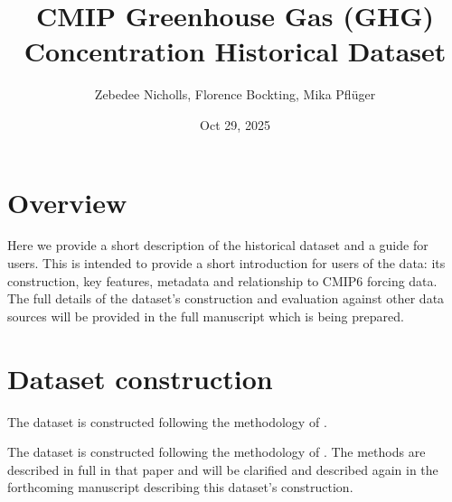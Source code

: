 \documentclass[letterpaper,10pt,english]{jupyterBook}
\title{CMIP Greenhouse Gas (GHG) Concentration Historical Dataset}
\date{Oct 29, 2025}
\author{Zebedee Nicholls, Florence Bockting, Mika Pflüger}
\begin{document}
\pagestyle{empty}
\sphinxmaketitle
\pagestyle{plain}
\sphinxtableofcontents
\pagestyle{normal}
\label{\detokenize{intro::doc}}


\sphinxstepscope


\chapter{Overview}
\label{\detokenize{user-guide-historical:overview}}\label{\detokenize{user-guide-historical::doc}}
\sphinxAtStartPar
Here we provide a short description of the historical dataset
and a guide for users.
This is intended to provide a short introduction for users of the data:
its construction, key features, metadata
and relationship to CMIP6 forcing data.
The full details of the dataset’s construction
and evaluation against other data sources
will be provided in the full manuscript which is being prepared.


\chapter{Dataset construction}
\label{\detokenize{user-guide-historical:dataset-construction}}
The dataset is constructed following the methodology of
\cite{meinshausen_historical_2017}.

\sphinxAtStartPar
The dataset is constructed following the methodology of
\cite{meinshausen_historical_2017}.
The methods are described in full in that paper
and will be clarified and described again
in the forthcoming manuscript describing this dataset’s construction.
\end{document}
